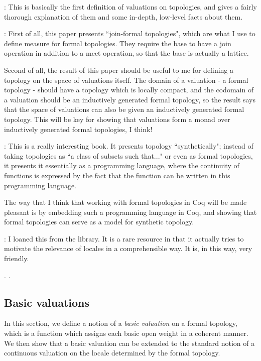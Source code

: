 \cite{jones1990}: This is basically the first definition of valuations on topologies, and gives a fairly thorough explanation of them and some in-depth, low-level facts about them.

\cite{maietti2005}: First of all, this paper presents ``join-formal topologies", which are what I use to define measure for formal topologies. They require the base to have a join operation in addition to a meet operation, so that the base is actually a lattice.

Second of all, the result of this paper should be useful to me for defining a topology on the space of valuations itself. The domain of a valuation - a formal topology - should have a topology which is locally compact, and the codomain of a valuation should be an inductively generated formal topology, so the result says that the space of valuations can also be given an inductively generated formal topology. This will be key for showing that valuations form a monad over inductively generated formal topologies, I think!

\cite{escardo2004}: This is a really interesting book. It presents topology ``synthetically"; instead of taking topologies as ``a class of subsets such that..." or even as formal topologies, it presents it essentially as a programming language, where the continuity of functions is expressed by the fact that the function can be written in this programming language.

The way that I think that working with formal topologies in Coq will be made pleasant is by embedding such a programming language in Coq, and showing that formal topologies can serve as a model for synthetic topology.

\cite{vickers1989}: I loaned this from the library. It is a rare resource in that it actually tries to motivate the relevance of locales in a comprehensible way. It is, in this way, very friendly.

\cite{coquand2003}. \cite{sambin2000}.

\subsection{Basic valuations}

In this section, we define a notion of a \emph{basic valuation} on a formal topology, which is a function which assigns each basic open weight in a coherent manner. We then show that a basic valuation can be extended to the standard notion of a continuous valuation on the locale determined by the formal topology.

